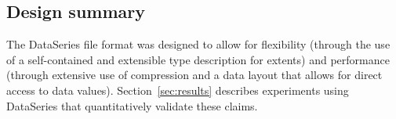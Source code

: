 \subsection{Design summary}

The DataSeries file format was designed to allow for flexibility
(through the use of a self-contained and extensible type description
for extents) and performance (through extensive use of compression and
a data layout that allows for direct access to data values). 
Section~\ref{sec:results} describes experiments using
DataSeries that quantitatively validate these claims.



